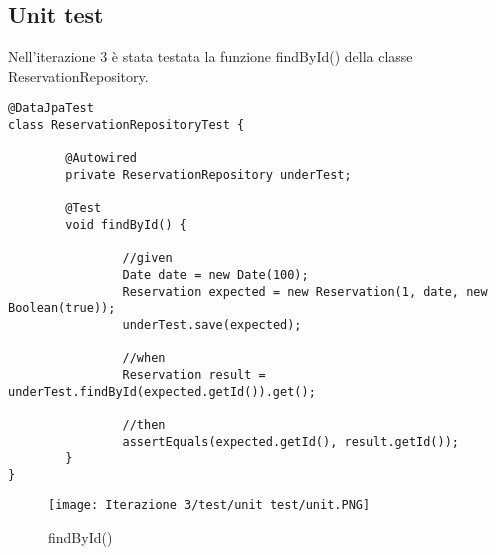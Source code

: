 \subsection{Unit test}
Nell'iterazione 3 è stata testata la funzione findById() della classe ReservationRepository.

\begin{lstlisting}
@DataJpaTest
class ReservationRepositoryTest {

        @Autowired
        private ReservationRepository underTest;

        @Test
        void findById() {

                //given
                Date date = new Date(100);
                Reservation expected = new Reservation(1, date, new Boolean(true));
                underTest.save(expected);

                //when
                Reservation result = underTest.findById(expected.getId()).get();

                //then
                assertEquals(expected.getId(), result.getId());
        }
}
\end{lstlisting}

\begin{figure}[h!]
\begin{center}

  \texttt{[image: Iterazione 3/test/unit test/unit.PNG]}\\
  \caption{findById()}
\end{center}
\end{figure}